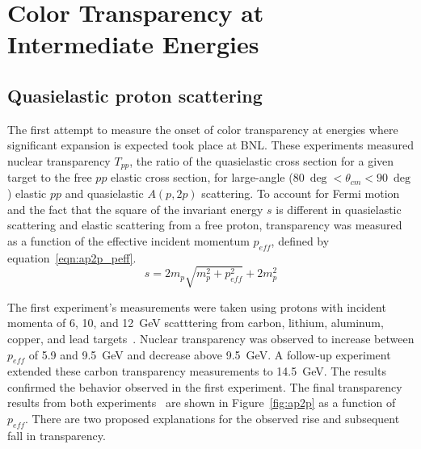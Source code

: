 \section{Color Transparency at Intermediate Energies}
\label{sec:ct_intermediate_energies}

\subsection{Quasielastic proton scattering}
The first attempt to measure the onset of color transparency at energies where
significant expansion is expected took place at BNL.
These experiments measured nuclear transparency $T_{pp}$,
the ratio of the quasielastic cross section for a given target to the free $pp$
elastic cross section, for large-angle
($\SI{80}{\deg} < \theta_{cm} < \SI{90}{\deg}$) elastic $pp$ and quasielastic
$A(p,2p)$ scattering.
To account for Fermi motion and the fact that the square of the invariant
energy $s$ is different in quasielastic scattering and elastic scattering
from a free proton, transparency was measured as a function of the effective
incident momentum $p_{eff}$, defined by equation~\ref{eqn:ap2p_peff}.
\begin{equation} \label{eqn:ap2p_peff}
    s = 2 m_p \sqrt{m_p^2 + p_{eff}^2} + 2m_p^2
\end{equation}

The first experiment's measurements were taken using protons with incident
momenta of 6, 10, and \SI{12}{\giga\electronvolt} scatttering from carbon,
lithium, aluminum, copper, and lead targets~\cite{Carroll_1988}.
Nuclear transparency was observed to increase between $p_{eff}$ of 5.9 and
\SI{9.5}{\giga\electronvolt} and decrease above \SI{9.5}{\giga\electronvolt}.
A follow-up experiment~\cite{Mardor_1998, Leksanov_2001} extended these
carbon transparency measurements to \SI{14.5}{\giga\electronvolt}.
The results confirmed the behavior observed in the first experiment.
The final transparency results from both experiments~\cite{Aclander_2004} are
shown in Figure~\ref{fig:ap2p} as a function of $p_{eff}$.
There are two proposed explanations for the observed rise and subsequent fall
in transparency.

